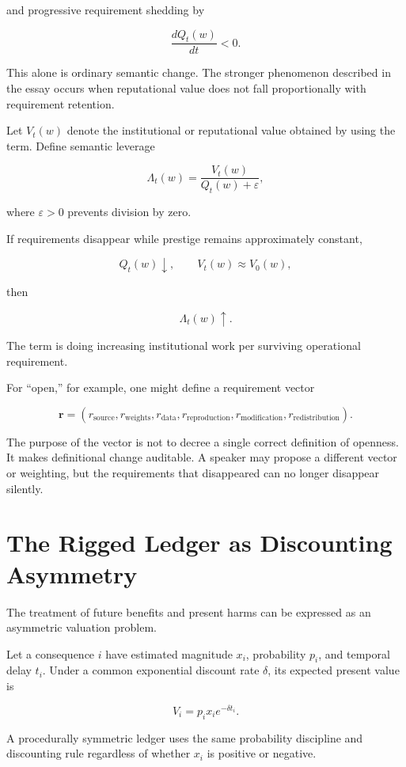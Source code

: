 \documentclass[11pt]{article}
\begin{document}
and progressive requirement shedding by

\[
\frac{dQ_t(w)}{dt}<0.
\]

This alone is ordinary semantic change. The stronger phenomenon described in
the essay occurs when reputational value does not fall proportionally with
requirement retention.

Let \(V_t(w)\) denote the institutional or reputational value obtained by
using the term. Define semantic leverage

\[
\Lambda_t(w)
=
\frac{V_t(w)}
{Q_t(w)+\varepsilon},
\]

where \(\varepsilon>0\) prevents division by zero.

If requirements disappear while prestige remains approximately constant,

\[
Q_t(w)\downarrow,
\qquad
V_t(w)\approx V_0(w),
\]

then

\[
\Lambda_t(w)\uparrow.
\]

The term is doing increasing institutional work per surviving operational
requirement.

For ``open,'' for example, one might define a requirement vector

\[
\mathbf r
=
(r_{\mathrm{source}},
r_{\mathrm{weights}},
r_{\mathrm{data}},
r_{\mathrm{reproduction}},
r_{\mathrm{modification}},
r_{\mathrm{redistribution}}).
\]

The purpose of the vector is not to decree a single correct definition of
openness. It makes definitional change auditable. A speaker may propose a
different vector or weighting, but the requirements that disappeared can no
longer disappear silently.


\section{The Rigged Ledger as Discounting Asymmetry}

The treatment of future benefits and present harms can be expressed as an
asymmetric valuation problem.

Let a consequence \(i\) have estimated magnitude \(x_i\), probability \(p_i\),
and temporal delay \(t_i\). Under a common exponential discount rate
\(\delta\), its expected present value is

\[
V_i=p_i x_i e^{-\delta t_i}.
\]

A procedurally symmetric ledger uses the same probability discipline and
discounting rule regardless of whether \(x_i\) is positive or negative.
\end{document}

